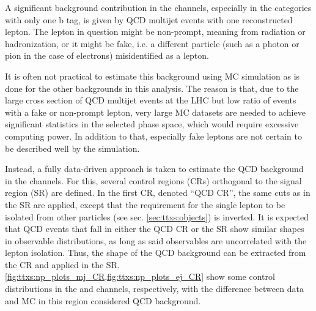 A significant background contribution in the \ljets channels, especially in the categories with only one b tag, is given by QCD multijet events with one reconstructed lepton. The lepton in question might be non-prompt, meaning from radiation or hadronization, or it might be fake, i.e. a different particle (such as a photon or pion in the case of electrons) misidentified as a lepton.

It is often not practical to estimate this background using MC simulation as is done for the other backgrounds in this analysis. The reason is that, due to the large cross section of QCD multijet events at the LHC but low ratio of events with a fake or non-prompt lepton, very large MC datasets are needed to achieve significant statistics in the selected phase space, which would require excessive computing power. In addition to that, especially fake leptons are not certain to be described well by the simulation.

Instead, a fully data-driven approach is taken to estimate the QCD background in the \ljets channels. For this, several control regions (CRs) orthogonal to the signal region (SR) are defined. In the first CR, denoted ``QCD CR'', the same cuts as in the SR are applied, except that the requirement for the single lepton to be isolated from other particles (see sec. \ref{sec:ttxs:objects}) is inverted. It is expected that QCD events that fall in either the QCD CR or the SR show similar shapes in observable distributions, as long as said observables are uncorrelated with the lepton isolation. Thus, the shape of the QCD background can be extracted from the CR and applied in the SR. \cref{fig:ttxs:np_plots_mj_CR,fig:ttxs:np_plots_ej_CR} show some control distributions in the \mujets and \ejets channels, respectively, with the difference between data and MC in this region considered QCD background.

